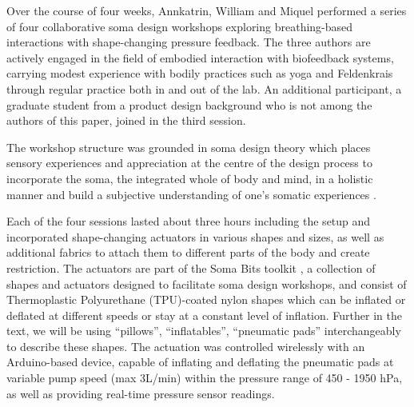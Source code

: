 Over the course of four weeks, Annkatrin, William and Miquel performed a series of four collaborative soma design workshops exploring breathing-based interactions with shape-changing pressure feedback. The three authors are actively engaged in the field of embodied interaction with biofeedback systems, carrying modest experience with bodily practices such as yoga and Feldenkrais through regular practice both in and out of the lab. An additional participant, a graduate student from a product design background who is not among the authors of this paper, joined in the third session.

The workshop structure was grounded in soma design theory which places sensory experiences and appreciation at the centre of the design process to incorporate the soma, the integrated whole of body and mind, in a holistic manner and build a subjective understanding of one’s somatic experiences \cite{hook_designing_2018}.


Each of the four sessions lasted about three hours including the setup and incorporated shape-changing actuators in various shapes and sizes, as well as additional fabrics to attach them to different parts of the body and create restriction. The actuators are part of the Soma Bits toolkit \cite{windlin_soma_2019}, a collection of shapes and actuators designed to facilitate soma design workshops, and consist of Thermoplastic Polyurethane (TPU)-coated nylon shapes which can be inflated or deflated at different speeds or stay at a constant level of inflation. Further in the text, we will be using ``pillows'', ``inflatables'', ``pneumatic pads'' interchangeably to describe these shapes. The actuation was controlled wirelessly with an Arduino-based device, capable of inflating and deflating the pneumatic pads at variable pump speed (max 3L/min) within the pressure range of 450 - 1950 hPa, as well as providing real-time pressure sensor readings.

